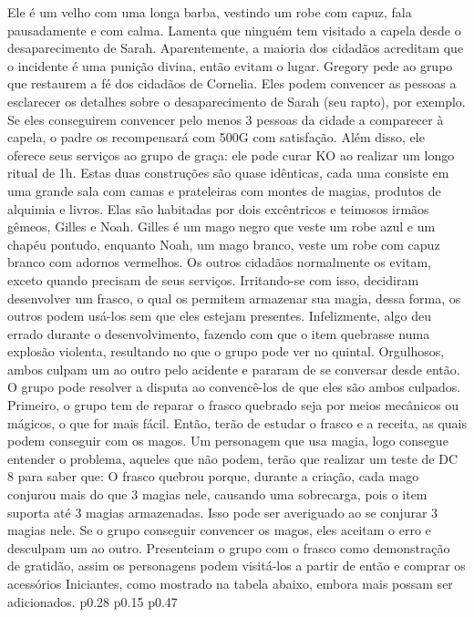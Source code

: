 Ele é um velho com uma longa barba, vestindo um robe com capuz, fala pausadamente e com calma.
Lamenta que ninguém tem visitado a capela desde o desaparecimento de Sarah.
Aparentemente, a maioria dos cidadãos acreditam que o incidente é uma punição divina, então evitam o lugar.
Gregory pede ao grupo que restaurem a fé dos cidadãos de Cornelia.
Eles podem convencer as pessoas a esclarecer os detalhes sobre o desaparecimento de Sarah (seu rapto), por exemplo.
Se eles conseguirem convencer pelo menos 3 pessoas da cidade a comparecer à capela, o padre os recompensará com 500G com satisfação.
Além disso, ele oferece seus serviços ao grupo de graça: ele pode curar KO ao realizar um longo ritual de 1h.
%
\clearpage
%
 Estas duas construções são quase idênticas, cada uma consiste em uma grande sala com camas e prateleiras com montes de magias, produtos de alquimia e livros. 
Elas são habitadas por dois excêntricos e teimosos irmãos gêmeos, Gilles e Noah.
Gilles é um mago negro que veste um robe azul e um chapéu pontudo, enquanto Noah, um mago branco, veste um robe com capuz branco com adornos vermelhos.
Os outros cidadãos normalmente os evitam, exceto quando precisam de seus serviços.
Irritando-se com isso, decidiram desenvolver um frasco, o qual os permitem armazenar sua magia, dessa forma, os outros podem usá-los sem que eles estejam presentes.
Infelizmente, algo deu errado durante o desenvolvimento, fazendo com que o item quebrasse numa explosão violenta, resultando no que o grupo pode ver no quintal.
Orgulhosos, ambos culpam um ao outro pelo acidente e pararam de se conversar desde então.
O grupo pode resolver a disputa ao convencê-los de que eles são ambos culpados.
Primeiro, o grupo tem de reparar o frasco quebrado seja por meios mecânicos ou mágicos, o que for mais fácil.
Então, terão de estudar o frasco e a receita, as quais podem conseguir com os magos.
Um personagem que usa magia, logo consegue entender o problema, aqueles que não podem, terão que realizar um teste de DC 8 para saber que: O frasco quebrou porque, durante a criação, cada mago conjurou mais do que 3 magias nele, causando uma sobrecarga, pois o item suporta até 3 magias armazenadas.
Isso pode ser averiguado ao se conjurar 3 magias nele. 
Se o grupo conseguir convencer os magos, eles aceitam o erro e desculpam um ao outro.
Presenteiam o grupo com o frasco como demonstração de gratidão, assim os personagens podem visitá-los a partir de então e comprar os acessórios Iniciantes, como mostrado na tabela abaixo, embora mais possam ser adicionados.
%
\ofpar
%
\oftable
{p{0.28\columnwidth} p{0.15\columnwidth} p{0.47\columnwidth}} 
